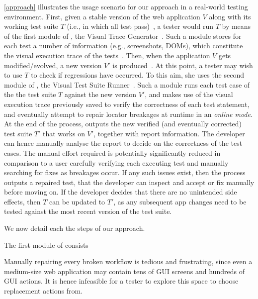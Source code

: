 \autoref{approach} illustrates the usage scenario for our approach in a real-world testing environment. 
First, given a stable version of the web application $V$ along with its working test suite $T$ (i.e., in which all test pass)~, a tester would run $T$ by means of the first module of \tool, the Visual Trace Generator~. Such a module stores for each test a number of information (e.g., screenshots, DOMs), which constitute the visual execution trace of the tests~. 
Then, when the application $V$ gets modified/evolved, a new version $V'$ is produced~. At this point, a tester may wish to use $T$ to check if regressions have occurred. To this aim, she uses the second module of \tool, the Visual Test Suite Runner~. Such a module runs each test case of the the test suite $T$ against the new version $V'$, and makes use of the visual execution trace previously saved to verify the correctness of each test statement, and eventually attempt to repair locator breakages at runtime in an \textit{online mode}. At the end of the process, \tool outputs the new verified (and eventually corrected) test suite $T'$ that works on $V'$, together with report information. 
The developer can hence manually analyse the report to decide on the correctness of the test cases. The manual effort required is potentially significantly reduced in comparison to a user carefully verifying each executing test and manually searching for fixes as breakages occur. If any such issues exist, then the process outputs a repaired test, that the developer can inspect and accept or fix  manually before moving on. If the developer decides that there are no unintended side effects, then $T$ can
be updated to $T'$, as any subsequent app changes need to be tested against the most recent version of the test suite.

We now detail each the steps of our approach.


The first module of \tool consists 



Manually repairing every broken workflow is tedious and frustrating, since even a medium-size web application may contain tens of GUI screens and hundreds of GUI actions. It is hence infeasible for a tester to explore this space to choose replacement actions from.


